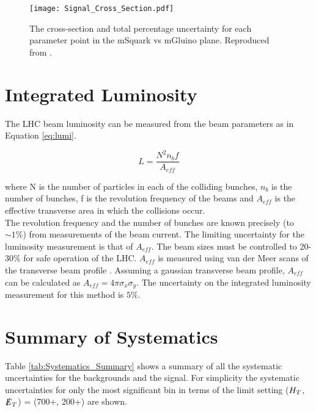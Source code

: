 \begin{figure}
\begin{center}
\texttt{[image: Signal\_Cross\_Section.pdf]}
\end{center}
\caption{The cross-section and total percentage uncertainty for each parameter 
point in the mSquark vs mGluino plane. Reproduced from \cite{ra3}.}
\label{fig:xsec_unc}
\end{figure}

\section{Integrated Luminosity}

The LHC beam luminosity can be measured from the beam parameters as in Equation
\ref{eq:lumi}.

\begin{equation}
L = \frac{N^{2}n_{b}f}{A_{eff}}
\label{eq:lumi}
\end{equation}

where N is the number of particles in each of the colliding bunches, $n_{b}$ is
the number of bunches, f is the revolution frequency of the beams and $A_{eff}$
is the effective transverse area in which the collisions occur. \\

The revolution frequency and the number of bunches are known precisely (to $\sim
1\%$) from measurements of the beam current. The limiting uncertainty for the
luminosity measurement is that of $A_{eff}$. The beam sizes must be controlled 
to 20-30\% for safe operation of the LHC. $A_{eff}$ is measured using van der 
Meer scans of the transverse beam profile \cite{vdm_scans}. Assuming a gaussian
transverse beam profile, $A_{eff}$ can be calculated as $A_{eff} = 
4\pi\sigma_{x}\sigma_{y}$. The uncertainty on the integrated luminosity 
measurement for this method is $5\%$. \\

\section{Summary of Systematics}

Table \ref{tab:Systematics_Summary} shows a summary of all the systematic
uncertainties for the backgrounds and the signal. For simplicity the systematic
uncertainties for only the most significant bin in terms of the limit setting 
($H_{T}$, $\slashed{E}_{T}$) = (700+, 200+) are shown.

